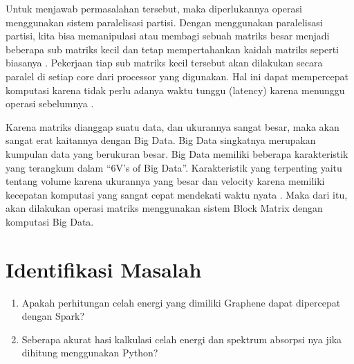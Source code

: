 \documentclass[12pt,a4paper]{report}
\begin{document}
	Untuk menjawab permasalahan tersebut, maka diperlukannya operasi menggunakan sistem paralelisasi partisi. Dengan menggunakan paralelisasi partisi, kita bisa memanipulasi atau membagi sebuah matriks besar menjadi beberapa sub matriks kecil dan tetap mempertahankan kaidah matriks seperti biasanya \cite{Ni2015}. Pekerjaan tiap sub matriks kecil tersebut akan dilakukan secara paralel di setiap core dari processor yang digunakan. Hal ini dapat mempercepat komputasi karena tidak perlu adanya waktu tunggu (latency) karena menunggu operasi sebelumnya \cite{Clayden2012}.  
	
	Karena matriks dianggap suatu data, dan ukurannya sangat besar, maka akan sangat erat kaitannya dengan Big Data. Big Data singkatnya merupakan kumpulan data yang berukuran besar. Big Data memiliki beberapa karakteristik yang terangkum dalam “6V’s of Big Data”. Karakteristik yang terpenting yaitu tentang volume karena ukurannya yang besar dan velocity karena memiliki kecepatan komputasi yang sangat cepat mendekati waktu nyata \cite{Clemons2010}. Maka dari itu, akan dilakukan operasi matriks menggunakan sistem Block Matrix dengan komputasi Big Data.


	\section{Identifikasi Masalah}
	\begin{enumerate}
	   	\item Apakah perhitungan celah energi yang dimiliki Graphene dapat dipercepat dengan Spark?
	   	\item Seberapa akurat hasi kalkulasi celah energi dan spektrum absorpsi nya jika dihitung menggunakan Python?
	\end{enumerate}
\end{document}

